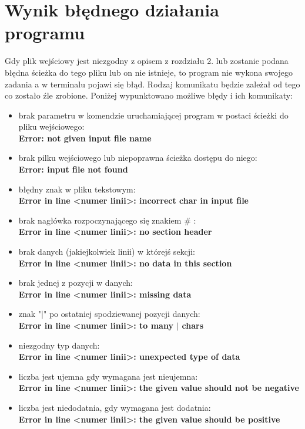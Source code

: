 \documentclass[10pt,a4paper]{article}
\begin{document}
\section{Wynik błędnego działania programu}
Gdy plik wejściowy jest niezgodny z opisem z rozdziału 2. lub zostanie podana błędna ścieżka do tego pliku lub on nie istnieje, to program nie wykona swojego zadania a w terminalu pojawi się błąd. Rodzaj komunikatu będzie zależał od tego co zostało źle zrobione. Poniżej wypunktowano możliwe błędy i ich komunikaty:
\begin{itemize}
\item brak parametru w komendzie uruchamiającej program w postaci ścieżki do pliku wejściowego:\\ \textbf{Error: not given input file name}
\item brak pilku wejściowego lub niepoprawna ścieżka dostępu do niego:\\ 			\textbf{Error: input file not found}
\item błędny znak w pliku tekstowym: \\ \textbf{Error in line \textless numer linii\textgreater: incorrect char in input file}
\item brak nagłówka rozpoczynającego się znakiem \# :\\ \textbf{Error in line \textless numer linii\textgreater: no section header}
\item brak danych (jakiejkolwiek linii) w którejś sekcji: \\ \textbf{Error in line \textless numer linii\textgreater: no data in this section}
\item brak jednej z pozycji w danych: \\ \textbf{Error in line \textless numer linii\textgreater: missing data}
\item znak "$\mid$" po ostatniej spodziewanej pozycji danych: \\ \textbf{Error in line \textless numer linii\textgreater: to many $\mid$ chars}
\item niezgodny typ danych: \\ \textbf{Error in line \textless numer linii\textgreater: unexpected type of data}
\item liczba jest ujemna gdy wymagana jest nieujemna: \\ \textbf{Error in line \textless numer linii\textgreater: the given value should not be negative}
\item liczba jest niedodatnia, gdy wymagana jest dodatnia: \\ \textbf{Error in line \textless numer linii\textgreater: the given value should be positive}

\end{itemize}
\end{document}
